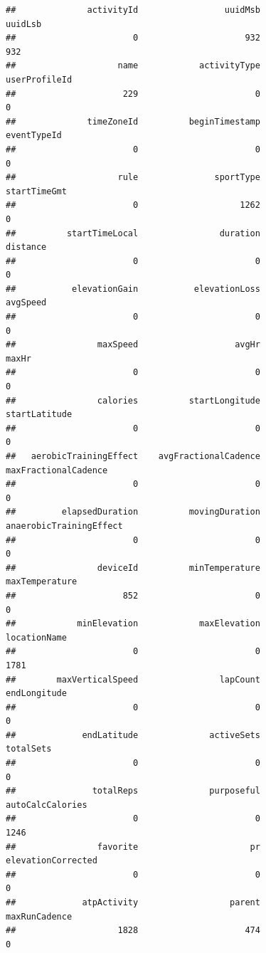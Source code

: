 \documentclass[
]{book}
\begin{document}
\begin{verbatim}
##              activityId                 uuidMsb                 uuidLsb 
##                       0                     932                     932 
##                    name            activityType           userProfileId 
##                     229                       0                       0 
##              timeZoneId          beginTimestamp             eventTypeId 
##                       0                       0                       0 
##                    rule               sportType            startTimeGmt 
##                       0                    1262                       0 
##          startTimeLocal                duration                distance 
##                       0                       0                       0 
##           elevationGain           elevationLoss                avgSpeed 
##                       0                       0                       0 
##                maxSpeed                   avgHr                   maxHr 
##                       0                       0                       0 
##                calories          startLongitude           startLatitude 
##                       0                       0                       0 
##   aerobicTrainingEffect    avgFractionalCadence    maxFractionalCadence 
##                       0                       0                       0 
##         elapsedDuration          movingDuration anaerobicTrainingEffect 
##                       0                       0                       0 
##                deviceId          minTemperature          maxTemperature 
##                     852                       0                       0 
##            minElevation            maxElevation            locationName 
##                       0                       0                    1781 
##        maxVerticalSpeed                lapCount            endLongitude 
##                       0                       0                       0 
##             endLatitude              activeSets               totalSets 
##                       0                       0                       0 
##               totalReps              purposeful        autoCalcCalories 
##                       0                       0                    1246 
##                favorite                      pr      elevationCorrected 
##                       0                       0                       0 
##             atpActivity                  parent           maxRunCadence 
##                    1828                     474                       0 

\end{verbatim}
\end{document}
